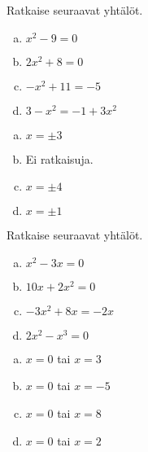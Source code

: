 \begin{tehtava}
    Ratkaise seuraavat yhtälöt.
    \begin{enumerate}[a)]
        \item $x^2 - 9 = 0$
        \item $2x^2 + 8 = 0$
        \item $-x^2 + 11 = -5$
        \item $3 - x^2 = -1 + 3x^2$
    \end{enumerate}
    \begin{vastaus}
        \begin{enumerate}[a)]
            \item $x=\pm3$
            \item Ei ratkaisuja.
            \item $x=\pm4$
            \item $x=\pm1$
        \end{enumerate}
    \end{vastaus}
\end{tehtava}

\begin{tehtava}
    Ratkaise seuraavat yhtälöt.
    \begin{enumerate}[a)]
        \item $x^2 - 3x = 0$
        \item $10x + 2x^2 = 0$
        \item $-3x^2 + 8x = -2x$
        \item $2x^2 - x^3 = 0$
    \end{enumerate}
    \begin{vastaus}
        \begin{enumerate}[a)]
            \item $x=0$ tai $x=3$
            \item $x=0$ tai $x=-5$
            \item $x=0$ tai $x=8$
            \item $x=0$ tai $x=2$
        \end{enumerate}
    \end{vastaus}
\end{tehtava}

